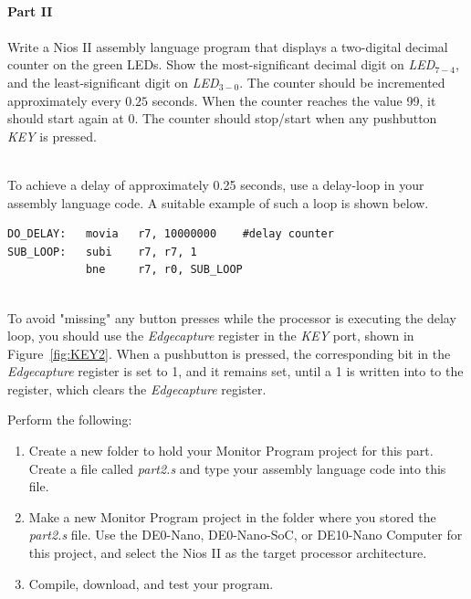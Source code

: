 \documentclass[epsfig,10pt,fullpage]{article}
\begin{document}
~\\
\noindent
{\bf Part II}
~\\
~\\
\noindent
Write a Nios II assembly language program that displays a two-digital decimal counter on the 
green LEDs. Show the most-significant decimal digit on {\it LED}$_{7-4}$, and
the least-significant digit on {\it LED}$_{3-0}$. The counter should be incremented approximately
every $0.25$ seconds. When the counter reaches the value 99, it should start again at 0.
The counter should stop/start when any pushbutton {\it KEY} is pressed.

~\\
\noindent
To achieve a delay of approximately 0.25 seconds, use a delay-loop in your assembly language
code. A suitable example of such a loop is shown below.

\begin{minipage}[t]{12.5 cm}
\begin{lstlisting}[style=defaultNiosStyle]
DO_DELAY: 	movia 	r7, 10000000 	#delay counter
SUB_LOOP: 	subi 	r7, r7, 1
			bne 	r7, r0, SUB_LOOP
\end{lstlisting}
\end{minipage}

~\\
\noindent
To avoid "missing" any button presses while the processor is executing the delay loop, you
should use the {\it Edgecapture} register in the {\it KEY} port, shown in Figure~\ref{fig:KEY2}.
When a pushbutton is pressed, the corresponding bit in the {\it Edgecapture} register is
set to 1, and it remains set, until a 1 is written into to the register, which clears the 
{\it Edgecapture} register.

\noindent
Perform the following:

\begin{enumerate}
\item Create a new folder to hold your Monitor Program project for this part. Create a
file called {\it part2.s} and type your assembly language code into this file.

\item
Make a new Monitor Program project in the folder where you stored the {\it part2.s}
file. Use the DE0-Nano, DE0-Nano-SoC, or DE10-Nano Computer for this project, and select 
the Nios II as the target processor architecture.

\item
Compile, download, and test your program. 
\end{enumerate}
\end{document}
